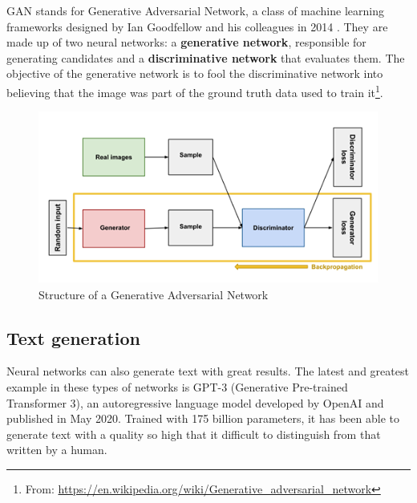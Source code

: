 GAN stands for Generative Adversarial Network, a class of machine learning frameworks designed by Ian Goodfellow and his colleagues in 2014 \cite{goodfellow2014generative}. They are made up of two neural networks: a \textbf{generative network}, responsible for generating candidates and a \textbf{discriminative network} that evaluates them. The objective of the generative network is to fool the discriminative network into believing that the image was part of the ground truth data used to train it\footnote{From: \url{https://en.wikipedia.org/wiki/Generative_adversarial_network}}.

\begin{figure}
    \centering
    \includegraphics{Images/Chapter 10/gan.png}
    \caption{Structure of a Generative Adversarial Network}
    \label{fig:ch10-gan}
\end{figure}

\subsection{Text generation}
Neural networks can also generate text with great results. The latest and greatest example in these types of networks is GPT-3 (Generative Pre-trained Transformer 3), an autoregressive language model developed by OpenAI and published in May 2020. Trained with 175 billion parameters, it has been able to generate text with a quality so high that it difficult to distinguish from that written by a human.